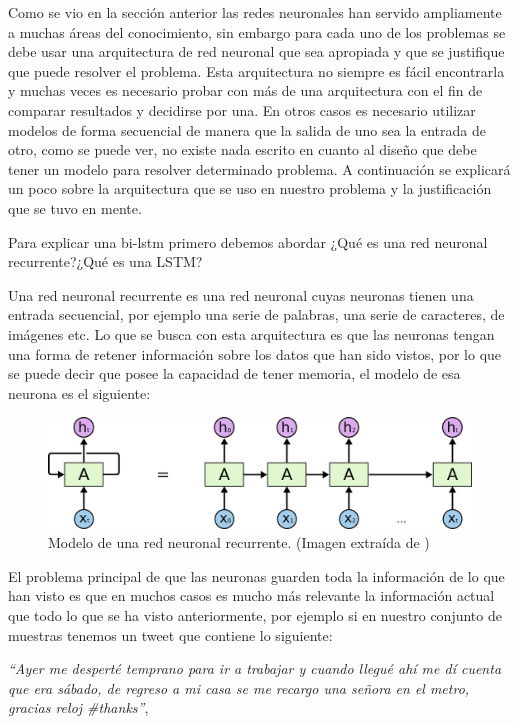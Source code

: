 \par Como se vio en la sección anterior las redes neuronales han servido ampliamente a muchas áreas del conocimiento, sin embargo para cada uno de los problemas se debe usar una arquitectura de red neuronal que sea apropiada y que se justifique que puede resolver el problema. Esta arquitectura no siempre es fácil encontrarla y muchas veces es necesario probar con más de una arquitectura con el fin de comparar resultados y decidirse por una. En otros casos es necesario utilizar modelos de forma secuencial de manera que la salida de uno sea la entrada de otro, como se puede ver, no existe nada escrito en cuanto al diseño que debe tener un modelo para resolver determinado problema. A continuación se explicará un poco sobre la arquitectura que se uso en nuestro problema y la justificación que se tuvo en mente.
            
\par Para explicar una \gls{bi-lstm} primero debemos abordar ¿Qué es una red neuronal recurrente?¿Qué es una LSTM?
            
\par Una red neuronal recurrente es una red neuronal cuyas neuronas tienen una entrada secuencial, por ejemplo una serie de palabras, una serie de caracteres, de imágenes etc. Lo que se busca con esta arquitectura es que las neuronas tengan una forma de retener información sobre los datos que han sido vistos, por lo que se puede decir que posee la capacidad de tener memoria, el modelo de esa neurona es el siguiente:
            
\begin{figure}[H]
	\centering
	\includegraphics[width=\textwidth]{imagenes/RNN-unrolled.png}
	\caption[]{Modelo de una red neuronal recurrente. (Imagen extraída de \cite{christopher_olah_2015}) }
\end{figure}
            
\par El problema principal de que las neuronas guarden toda la información de lo que han visto es que en muchos casos es mucho más relevante la información actual que todo lo que se ha visto anteriormente, por ejemplo si en nuestro conjunto de muestras tenemos un tweet que contiene lo siguiente:
\vspace{5pt}
\begin{center}
	\textit{``Ayer me desperté temprano para ir a trabajar y cuando llegué ahí me dí cuenta que era sábado, de regreso a mi casa se me recargo una señora en el metro, gracias reloj \#thanks''}, 
	\label{fig:frase}
\end{center}
\vspace{5pt}
            
